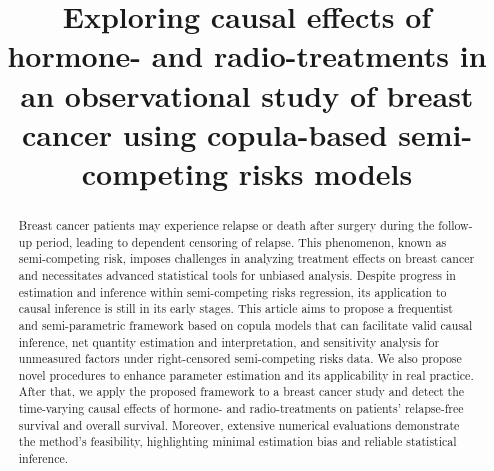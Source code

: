 \documentclass[aoas]{imsart}
\theoremstyle{plain}
\begin{document}
\begin{frontmatter}
\title{Exploring causal effects of hormone- and radio-treatments in an observational study of breast cancer using copula-based semi-competing risks models}
\runtitle{}


\begin{abstract}
Breast cancer patients may experience relapse or death after surgery during the follow-up period, leading to dependent censoring of relapse. This phenomenon, known as semi-competing risk, imposes challenges in analyzing treatment effects on breast cancer and necessitates advanced statistical tools for unbiased analysis. Despite progress in estimation and inference within semi-competing risks regression, its application to causal inference is still in its early stages. This article aims to propose a frequentist and semi-parametric framework based on copula models that can facilitate valid causal inference, net quantity estimation and interpretation, and sensitivity analysis for unmeasured factors under right-censored semi-competing risks data. We also propose novel procedures to enhance parameter estimation and its applicability in real practice. After that, we apply the proposed framework to a breast cancer study and detect the time-varying causal effects of hormone- and radio-treatments on patients' relapse-free survival and overall survival. Moreover, extensive numerical evaluations demonstrate the method's feasibility, highlighting minimal estimation bias and reliable statistical inference.
\end{abstract}

\begin{keyword}
\end{keyword}

\end{frontmatter}
\end{document}
